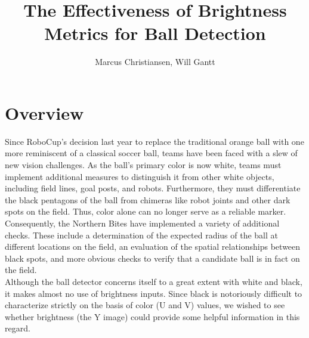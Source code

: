 \documentclass[11pt, twocolumn]{article}
\begin{document}
\title{The Effectiveness of Brightness Metrics for Ball Detection}
\author{Marcus Christiansen, Will Gantt}
\maketitle

\section{Overview}
Since RoboCup's decision last year to replace the traditional orange ball with one more reminiscent of a classical soccer ball, teams have been faced with a slew of new vision challenges. As the ball's primary color is now white, teams must implement additional measures to distinguish it from other white objects, including field lines, goal posts, and robots. Furthermore, they must differentiate the black pentagons of the ball from chimeras like robot joints and other dark spots on the field. Thus, color alone can no longer serve as a reliable marker. Consequently, the Northern Bites have implemented a variety of additional checks. These include a determination of the expected radius of the ball at different locations on the field, an evaluation of the spatial relationships between black spots, and more obvious checks to verify that a candidate ball is in fact on the field. \\
\indent Although the ball detector concerns itself to a great extent with white and black, it makes almost no use of brightness inputs. Since black is notoriously difficult to characterize strictly on the basis of color (U and V) values, we wished to see whether brightness (the Y image) could provide some helpful information in this regard. 
\end{document}
